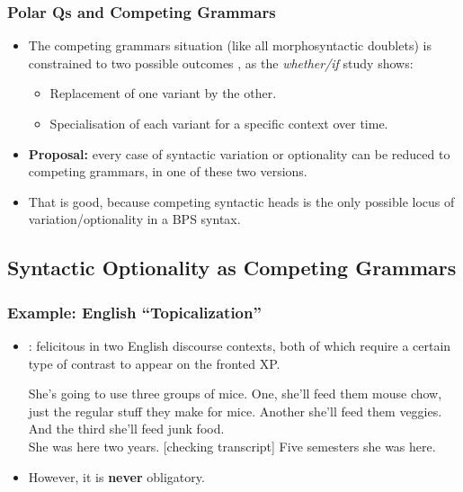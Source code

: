 \documentclass[hyperref={pdfpagelabels=false}]{beamer}
\begin{document}
\begin{frame}
\frametitle{Polar Qs and Competing Grammars}
\begin{itemize}
	\item The competing grammars situation (like all morphosyntactic doublets) is constrained to two possible outcomes \citep{kroch1994}, as the \textsl{whether/if} study shows:
		\begin{itemize}
			\item Replacement of one variant by the other.
			\item Specialisation of each variant for a specific context over time.
		\end{itemize}
	\item \textbf{Proposal:} every case of syntactic variation or optionality can be reduced to competing grammars, in one of these two versions.
	\item That is good, because competing syntactic heads is the only possible locus of variation/optionality in a BPS syntax.
\end{itemize}
\end{frame}

\subsection{Syntactic Optionality as Competing Grammars}
\begin{frame}
\frametitle{Example: English ``Topicalization''}
\begin{itemize}
	\item \citet{prince1985,prince1998, prince1999}: felicitous in two English discourse contexts, both of which require a certain type of contrast to appear on the fronted XP.
	
	\begin{exe}
\ex \label{princetop1} She's going to use three groups of mice.
One, she'll feed them mouse chow, just the regular stuff they make for
mice.
Another she'll feed them veggies.
And the third she'll feed junk food.\\

\ex \label{princetop2} She was here two years.
[checking transcript] Five semesters she was here.\\
\citep[][8,9]{prince1999} 

\end{exe}

	\item However, it is \textbf{never} obligatory.
\end{itemize}
\end{frame}
\end{document}

